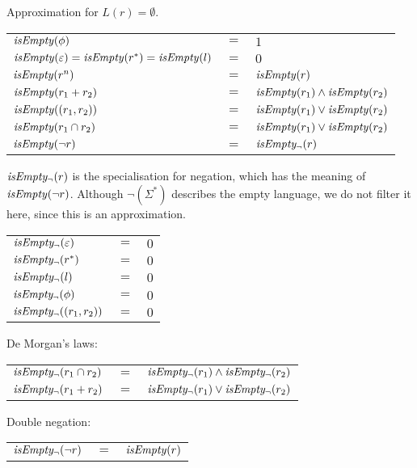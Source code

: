 \needspace{5cm}
\begin{defn}
   \label{defn-isempty}
   Approximation for $L(r) = \emptyset$.

   \begin{tabular}{lll}
      $\mathit{isEmpty}(\phi)$	& 	$=$ & $1$ \\
      $\mathit{isEmpty}(\varepsilon) = \mathit{isEmpty}(r^*) = \mathit{isEmpty}(l)$
         & $=$ & $0$ \\
      $\mathit{isEmpty}(r^n)$		& $=$ & $\mathit{isEmpty}(r)$ \\
      $\mathit{isEmpty}(r_1 + r_2)$	& $=$ & $\mathit{isEmpty}(r_1) \wedge \mathit{isEmpty}(r_2)$ \\
      $\mathit{isEmpty}((r_1, r_2))$	& $=$ & $\mathit{isEmpty}(r_1) \vee \mathit{isEmpty}(r_2)$ \\
      $\mathit{isEmpty}(r_1 \cap r_2)$	& $=$ & $\mathit{isEmpty}(r_1) \vee \mathit{isEmpty}(r_2)$ \\
      $\mathit{isEmpty}(\neg r)$	& $=$ & $\mathit{isEmpty_\neg}(r)$ \\
   \end{tabular}

   $\mathit{isEmpty_\neg}(r)$ is the specialisation for negation, which has the meaning of
   $\mathit{isEmpty}(\neg r)$. Although $\neg(\Sigma^*)$ describes the empty language, we
   do not filter it here, since this is an approximation.

   \begin{tabular}{lll}
      $\mathit{isEmpty_\neg}(\varepsilon)$	& $=$ & $0$ \\
      $\mathit{isEmpty_\neg}(r^*)$		& $=$ & $0$ \\
      $\mathit{isEmpty_\neg}(l)$			& $=$ & $0$ \\
      $\mathit{isEmpty_\neg}(\phi)$		& $=$ & $0$ \\
      $\mathit{isEmpty_\neg}((r_1, r_2))$		& $=$ & $0$ \\
   \end{tabular}

   De Morgan's laws:

   \begin{tabular}{lll}
      $\mathit{isEmpty_\neg}(r_1 \cap r_2)$	& $=$ & $\mathit{isEmpty_\neg}(r_1) \wedge \mathit{isEmpty_\neg}(r_2)$ \\
      $\mathit{isEmpty_\neg}(r_1 + r_2)$		& $=$ & $\mathit{isEmpty_\neg}(r_1) \vee \mathit{isEmpty_\neg}(r_2)$ \\
   \end{tabular}

   Double negation:

   \begin{tabular}{lll}
      $\mathit{isEmpty_\neg}(\neg r)$	& $=$ & $\mathit{isEmpty}(r)$ \\
   \end{tabular}
\end{defn}

